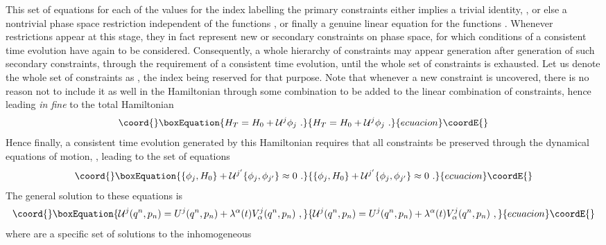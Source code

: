\documentclass[a4paper,11pt]{article}
\begin{document}
This set of equations for each of the values for the index \coordHE{} labelling the
primary constraints either implies a trivial identity, \coordHE{}, or else
a nontrivial phase space restriction \coordHE{} independent of
the functions \coordHE{}, or finally a genuine linear equation for
the functions \coordHE{}. Whenever restrictions \coordHE{}
appear at this stage, they in fact represent new or secondary constraints
on phase space, for which conditions of a consistent time evolution
have again to be considered. Consequently, a whole hierarchy of constraints
may appear generation after generation of such secondary constraints, 
through the requirement of a consistent time evolution, until the whole set 
of constraints is exhausted. Let us denote the whole set of constraints as 
\coordHE{}, the index \coordHE{} being reserved for that purpose. Note 
that whenever a new constraint \coordHE{} is uncovered, there is no reason 
not to include it as well in the Hamiltonian through some combination 
\coordHE{} to be added to the linear combination of 
constraints, hence leading {\sl in fine\/} to the total Hamiltonian
\begin{equation}\coord{}\boxEquation{
H_T=H_0+{\cal U}^j\phi_j\ .
}{
H_T=H_0+{\cal U}^j\phi_j\ .
}{ecuacion}\coordE{}\end{equation}
Hence finally, a consistent time evolution generated by this Hamiltonian
requires that all constraints \coordHE{} be preserved through
the dynamical equations of motion, \coordHE{}, leading to the 
set of equations
\begin{equation}\coord{}\boxEquation{
\{\phi_j,H_0\}+{\cal U}^{j'}\{\phi_j,\phi_{j'}\}\approx 0\ .
}{
\{\phi_j,H_0\}+{\cal U}^{j'}\{\phi_j,\phi_{j'}\}\approx 0\ .
}{ecuacion}\coordE{}\end{equation}
The general solution to these equations is
\begin{equation}\coord{}\boxEquation{
{\cal U}^j(q^n,p_n)=U^j(q^n,p_n)+\lambda^\alpha(t)V^j_\alpha(q^n,p_n)\ ,
}{
{\cal U}^j(q^n,p_n)=U^j(q^n,p_n)+\lambda^\alpha(t)V^j_\alpha(q^n,p_n)\ ,
}{ecuacion}\coordE{}\end{equation}
where \coordHE{} are a specific set of solutions to the inhomogeneous 
\end{document}

